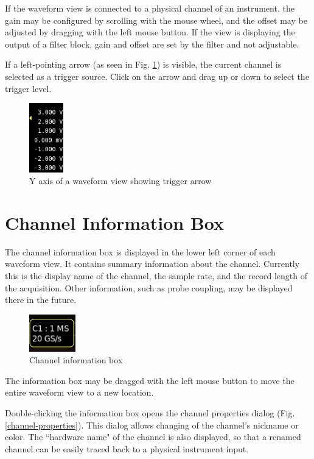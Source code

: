If the waveform view is connected to a physical channel of an instrument, the gain may be configured by scrolling with
the mouse wheel, and the offset may be adjusted by dragging with the left mouse button. If the view is displaying the
output of a filter block, gain and offset are set by the filter and not adjustable.

If a left-pointing arrow (as seen in Fig. \ref{y-axis}) is visible, the current channel is selected as a trigger
source. Click on the arrow and drag up or down to select the trigger level.

\begin{figure}[H]
\centering
\includegraphics[height=3cm]{images/y-axis.png}
\caption{Y axis of a waveform view showing trigger arrow}
\label{y-axis}
\end{figure}

\section{Channel Information Box}

The channel information box is displayed in the lower left corner of each waveform view. It contains summary
information about the channel. Currently this is the display name of the channel, the sample rate, and the record
length of the acquisition. Other information, such as probe coupling, may be displayed there in the future.

\begin{figure}[H]
\centering
\includegraphics[width=2cm]{images/channel-infobox.png}
\caption{Channel information box}
\label{channel-infobox}
\end{figure}

The information box may be dragged with the left mouse button to move the entire waveform view to a new location.

Double-clicking the information box opens the channel properties dialog (Fig. \ref{channel-properties}). This dialog
allows changing of the channel's nickname or color. The ``hardware name" of the channel is also displayed, so that a
renamed channel can be easily traced back to a physical instrument input.

